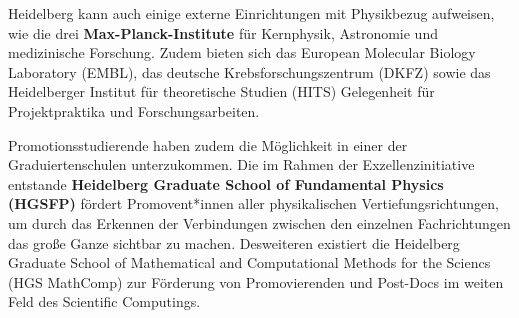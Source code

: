Heidelberg kann auch einige externe Einrichtungen mit Physikbezug aufweisen, wie die drei \textbf{Max-Planck-Institute} für Kernphysik, Astronomie und medizinische Forschung. Zudem bieten sich das European Molecular Biology Laboratory (EMBL), das deutsche Krebsforschungszentrum (DKFZ) sowie das Heidelberger Institut für theoretische Studien (HITS) Gelegenheit für Projektpraktika und Forschungsarbeiten.

Promotionsstudierende haben zudem die Möglichkeit in einer der Graduiertenschulen unterzukommen. 
Die im Rahmen der Exzellenzinitiative entstande \textbf{Heidelberg Graduate School of Fundamental Physics (HGSFP)} fördert Promovent*innen aller physikalischen Vertiefungsrichtungen, um durch das Erkennen der Verbindungen zwischen den einzelnen Fachrichtungen das große Ganze sichtbar zu machen.
Desweiteren existiert die Heidelberg Graduate School of Mathematical and Computational Methods for the Sciencs (HGS MathComp) zur Förderung von Promovierenden und Post-Docs im weiten Feld des Scientific Computings.\\

%
%